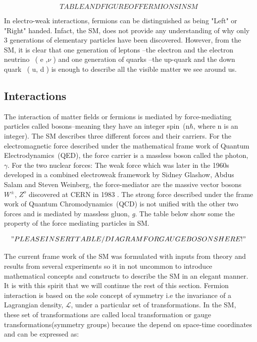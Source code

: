 \begin{equation}
 TABLE AND FIGURE OF FERMIONS IN SM
\end{equation}

In electro-weak interactions, fermions can be distinguished as being "Left" or "Right" handed.  Infact, the SM, does not provide any understanding of why only 3 generations of elementary particles have been discovered.
However, from the SM, it is clear that one generation of leptons --the electron and the electron neutrino ~( e ,$\nu$ ) and one generation of quarks --the up-quark and the down quark ~( u, d ) is enough to describe all the visible matter we see around us.
\subsection*{Interactions}
The interaction of matter fields or fermions is mediated by force-mediating particles called bosons--meaning they have an integer spin~(n$\hbar$, where n is an integer). The SM describes three different forces and their carriers. For the electromagnetic force described under the mathematical frame work of Quantum Electrodynamics~(QED), the force carrier is a massless boson called the photon, $\gamma$. For the two nuclear forces: The weak force which was later in the 1960s developed in a combined electroweak framework by Sidney Glashow, Abdus Salam and Steven Weinberg\cite{}, the force-mediator are the massive vector bosons $W^{\pm}$, $Z^{o}$ discovered at CERN in 1983 \cite{}. The strong force described under the frame work of Quantum Chromodynamics~(QCD) is not unified with the other two forces and is mediated by massless gluon, \textit{g}. The table below show some the property of the force mediating particles in SM.

\begin{equation}
 "PLEASE INSERT TABLE/DIAGRAM FOR GAUGE BOSONS HERE!"
\end{equation}

The current frame work of the SM was formulated with inputs from theory and results from several experiments so it in not uncommon to introduce mathematical concepts and constructs to describe the SM in an elegant manner. It is with this spirit that we will continue the rest of this section.
\newline
Fermion interaction is based on the sole concept of symmetry i.e the invariance of a Lagrangian density, $\mathcal{L}$, under a particular set of transformations. In the SM, these set of transformations are called local transformation or gauge transformations(symmetry groups) because the depend on space-time coordinates and can be expressed as:

